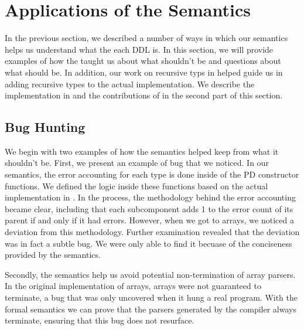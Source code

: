 \section{Applications of the Semantics}
\label{sec:applications}

In the previous section, we described a number of ways in which our
semantics helps us understand what the each DDL is. In this section,
we will provide examples of how the \ddc{} taught us about what
shouldn't be and questions about what \pads{} should be. In addition,
our work on recursive typs in \ddc{} helped guide us in adding
recursive types to the actual \pads{} implementation. We describe the
implementation in \pads{} and the contributions of \ddc{} in the
second part of this section.


\subsection{Bug Hunting}

We begin with two examples of how the semantics helped keep \pads{}
from what it shouldn't be. First, we present an example of bug that we
noticed. In our semantics, the error accounting for each type is done
inside of the PD constructor functions. We defined the logic inside
these functions based on the actual implementation in \pads{}. In the
process, the methodology behind the error accounting became clear,
including that each subcomponent adds 1 to the error count of its
parent if and only if it had errors. However, when we got to arrays,
we noticed a deviation from this methodology. Further examination
revealed that the deviation was in fact a subtle bug. We were only
able to find it becuase of the conciseness provided by the semantics.

Secondly, the semantics help us avoid potential non-termination of
array parsers. In the original implementation of \pads{} arrays,
arrays were not guaranteed to terminate, a bug that was only uncovered
when it hung a real program. With the formal semantics we can prove
that the parsers generated by the compiler always terminate, ensuring
that this bug does not resurface.



